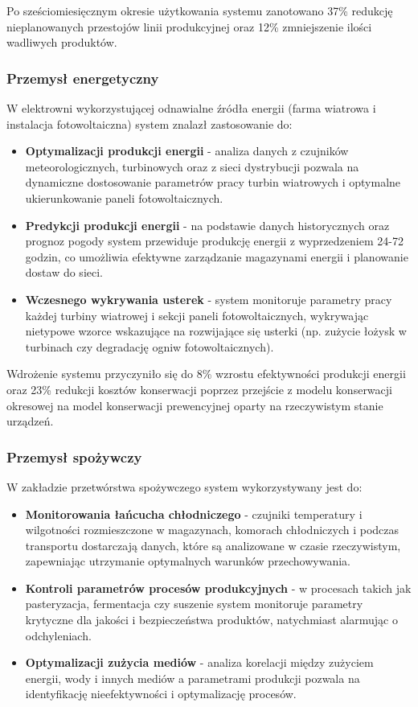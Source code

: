 Po sześciomiesięcznym okresie użytkowania systemu zanotowano 37\% redukcję nieplanowanych przestojów linii produkcyjnej oraz 12\% zmniejszenie ilości wadliwych produktów.

\subsubsection{Przemysł energetyczny}
\label{subsubsec:przemysl_energetyczny}

W elektrowni wykorzystującej odnawialne źródła energii (farma wiatrowa i instalacja fotowoltaiczna) system znalazł zastosowanie do:

\begin{itemize}
    \item \textbf{Optymalizacji produkcji energii} - analiza danych z czujników meteorologicznych, turbinowych oraz z sieci dystrybucji pozwala na dynamiczne dostosowanie parametrów pracy turbin wiatrowych i optymalne ukierunkowanie paneli fotowoltaicznych.
    \item \textbf{Predykcji produkcji energii} - na podstawie danych historycznych oraz prognoz pogody system przewiduje produkcję energii z wyprzedzeniem 24-72 godzin, co umożliwia efektywne zarządzanie magazynami energii i planowanie dostaw do sieci.
    \item \textbf{Wczesnego wykrywania usterek} - system monitoruje parametry pracy każdej turbiny wiatrowej i sekcji paneli fotowoltaicznych, wykrywając nietypowe wzorce wskazujące na rozwijające się usterki (np. zużycie łożysk w turbinach czy degradację ogniw fotowoltaicznych).
\end{itemize}

Wdrożenie systemu przyczyniło się do 8\% wzrostu efektywności produkcji energii oraz 23\% redukcji kosztów konserwacji poprzez przejście z modelu konserwacji okresowej na model konserwacji prewencyjnej oparty na rzeczywistym stanie urządzeń.

\subsubsection{Przemysł spożywczy}
\label{subsubsec:przemysl_spozywczy}

W zakładzie przetwórstwa spożywczego system wykorzystywany jest do:

\begin{itemize}
    \item \textbf{Monitorowania łańcucha chłodniczego} - czujniki temperatury i wilgotności rozmieszczone w magazynach, komorach chłodniczych i podczas transportu dostarczają danych, które są analizowane w czasie rzeczywistym, zapewniając utrzymanie optymalnych warunków przechowywania.
    \item \textbf{Kontroli parametrów procesów produkcyjnych} - w procesach takich jak pasteryzacja, fermentacja czy suszenie system monitoruje parametry krytyczne dla jakości i bezpieczeństwa produktów, natychmiast alarmując o odchyleniach.
    \item \textbf{Optymalizacji zużycia mediów} - analiza korelacji między zużyciem energii, wody i innych mediów a parametrami produkcji pozwala na identyfikację nieefektywności i optymalizację procesów.
\end{itemize}

